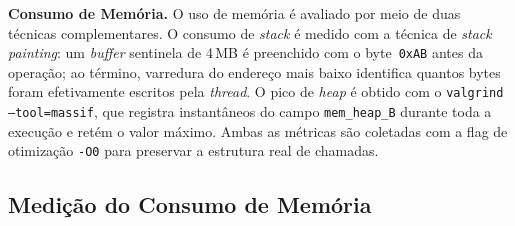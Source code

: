 %
%

\item \textbf{Consumo de Memória.}
O uso de memória é avaliado por meio de duas técnicas complementares.
O consumo de \textit{stack} é medido com a técnica de
\textit{stack painting}: um \textit{buffer} sentinela de 4\,MB é
preenchido com o byte~\texttt{0xAB} antes da operação; ao término,
varredura do endereço mais baixo identifica quantos bytes foram
efetivamente escritos pela \textit{thread}.
O pico de \textit{heap} é obtido com o
\texttt{valgrind --tool=massif}, que registra instantâneos do campo
\texttt{mem\_heap\_B} durante toda a execução e retém o valor máximo.
Ambas as métricas são coletadas com a flag de otimização
\texttt{-O0} para preservar a estrutura real de chamadas.


%

\subsection{Medição do Consumo de Memória}
\label{sec:impl-memoria}

